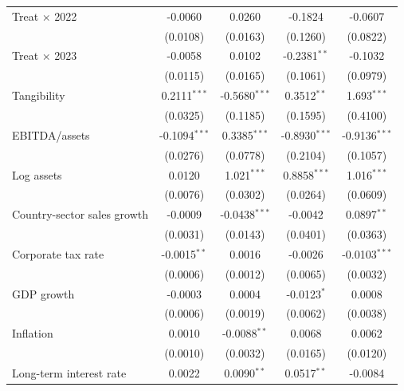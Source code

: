 \begin{table}[htbp]
\begin{tabular}{lcccc}
      Treat $\times$ 2022     & -0.0060         & 0.0260          & -0.1824          & -0.0607 \\
                              & (0.0108)        & (0.0163)        & (0.1260)         & (0.0822) \\
      Treat $\times$ 2023     & -0.0058         & 0.0102          & -0.2381$^{**}$   & -0.1032 \\
                              & (0.0115)        & (0.0165)        & (0.1061)         & (0.0979) \\
      Tangibility             & 0.2111$^{***}$   & -0.5680$^{***}$ & 0.3512$^{**}$    & 1.693$^{***}$ \\
                              & (0.0325)        & (0.1185)        & (0.1595)         & (0.4100) \\
      EBITDA/assets           & -0.1094$^{***}$ & 0.3385$^{***}$  & -0.8930$^{***}$  & -0.9136$^{***}$ \\
                              & (0.0276)        & (0.0778)        & (0.2104)         & (0.1057) \\
      Log assets              & 0.0120          & 1.021$^{***}$   & 0.8858$^{***}$   & 1.016$^{***}$ \\
                              & (0.0076)        & (0.0302)        & (0.0264)         & (0.0609) \\
      Country-sector sales growth & -0.0009     & -0.0438$^{***}$ & -0.0042          & 0.0897$^{**}$ \\
                              & (0.0031)        & (0.0143)        & (0.0401)         & (0.0363) \\
      Corporate tax rate      & -0.0015$^{**}$  & 0.0016          & -0.0026          & -0.0103$^{***}$ \\
                              & (0.0006)        & (0.0012)        & (0.0065)         & (0.0032) \\
      GDP growth              & -0.0003         & 0.0004          & -0.0123$^{*}$    & 0.0008 \\
                              & (0.0006)        & (0.0019)        & (0.0062)         & (0.0038) \\
      Inflation               & 0.0010          & -0.0088$^{**}$  & 0.0068           & 0.0062 \\
                              & (0.0010)        & (0.0032)        & (0.0165)         & (0.0120) \\
      Long-term interest rate & 0.0022          & 0.0090$^{**}$   & 0.0517$^{**}$    & -0.0084 \\

\end{tabular}
\end{table}

